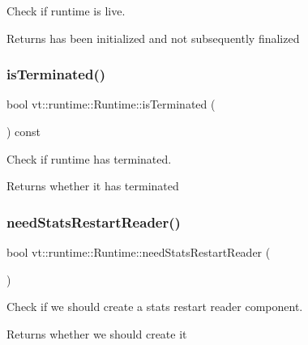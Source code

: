Check if runtime is live. 

\begin{DoxyReturn}{Returns}
has been initialized and not subsequently finalized 
\end{DoxyReturn}
\mbox{\label{structvt_1_1runtime_1_1_runtime_a2c2561be8be311f01e11fc8e10725c77}} 
\subsubsection{\texorpdfstring{is\+Terminated()}{isTerminated()}}
{\footnotesize\ttfamily bool vt\+::runtime\+::\+Runtime\+::is\+Terminated (\begin{DoxyParamCaption}{ }\end{DoxyParamCaption}) const\hspace{0.3cm}{\ttfamily [inline]}}



Check if runtime has terminated. 

\begin{DoxyReturn}{Returns}
whether it has terminated 
\end{DoxyReturn}
\mbox{\label{structvt_1_1runtime_1_1_runtime_a2c4ba18d500526776e4e0d1fcde215eb}} 
\subsubsection{\texorpdfstring{need\+Stats\+Restart\+Reader()}{needStatsRestartReader()}}
{\footnotesize\ttfamily bool vt\+::runtime\+::\+Runtime\+::need\+Stats\+Restart\+Reader (\begin{DoxyParamCaption}{ }\end{DoxyParamCaption})\hspace{0.3cm}{\ttfamily [protected]}}



Check if we should create a stats restart reader component. 

\begin{DoxyReturn}{Returns}
whether we should create it 
\end{DoxyReturn}
\mbox{\label{structvt_1_1runtime_1_1_runtime_aa9759e29e6159ac0d84c60dd609cbcad}} 
